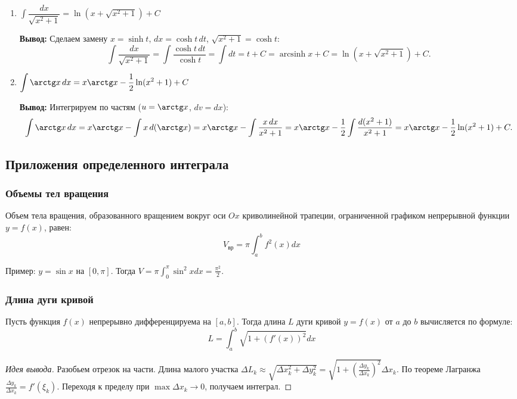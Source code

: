 \documentclass[12pt]{article}
\newcommand{\dint}{\displaystyle\int}
\begin{document}
\begin{enumerate}
        \item $\dint \dfrac{dx}{\sqrt{x^2+1}} = \ln\!\left(x + \sqrt{x^2+1}\right) + C$
        
        \textbf{Вывод:} Сделаем замену $x = \sinh t$, $dx = \cosh t\,dt$, $\sqrt{x^2+1} = \cosh t$:
        \[
            \dint\frac{dx}{\sqrt{x^2+1}}
            = \dint\frac{\cosh t\,dt}{\cosh t}
            = \dint dt
            = t + C
            = \operatorname{arcsinh} x + C
            = \ln\!\left(x + \sqrt{x^2+1}\right) + C.
        \]
        
        \item $\dint \arctg x\,dx = x\arctg x - \dfrac{1}{2}\ln(x^2+1) + C$
        
        \textbf{Вывод:} Интегрируем по частям ($u = \arctg x$, $dv = dx$):
        \[
            \dint \arctg x\,dx
            = x\arctg x - \dint x\,d(\arctg x)
            = x\arctg x - \dint \frac{x\,dx}{x^2+1}
            = x\arctg x - \frac{1}{2}\dint\frac{d(x^2+1)}{x^2+1}
            = x\arctg x - \frac{1}{2}\ln(x^2+1) + C.
        \]
    \end{enumerate}

	\subsection{Приложения определенного интеграла}

	\subsubsection{Объемы тел вращения}
	\begin{statement}
		Объем тела вращения, образованного вращением вокруг оси $Ox$ криволинейной трапеции, ограниченной графиком непрерывной функции $y = f(x)$, равен:
		$$ V_{\text{вр}} = \pi \dint_a^b f^2(x) dx $$
	\end{statement}
	\noindent
	Пример: $y = \sin x$ на $[0, \pi]$. Тогда $V = \pi \dint_0^\pi \sin^2 x dx = \frac{\pi^2}{2}$.

	\subsubsection{Длина дуги кривой}
	\begin{statement}
		Пусть функция $f(x)$ непрерывно дифференцируема на $[a, b]$. Тогда длина $L$ дуги кривой $y = f(x)$ от $a$ до $b$ вычисляется по формуле:
		$$ L = \dint_a^b \sqrt{1 + (f'(x))^2} dx $$
	\end{statement}
	\begin{proof}[Идея вывода]
		Разобьем отрезок на части. Длина малого участка $\Delta L_k \approx \sqrt{\Delta x_k^2 + \Delta y_k^2} = \sqrt{1 + (\frac{\Delta y_k}{\Delta x_k})^2} \Delta x_k$. По теореме Лагранжа $\frac{\Delta y_k}{\Delta x_k} = f'(\xi_k)$. Переходя к пределу при $\max \Delta x_k \rightarrow 0$, получаем интеграл.
	\end{proof}
\end{document}
